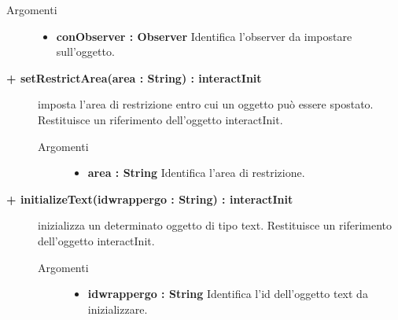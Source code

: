 \begin{description}
\begin{description}
		\begin{description}
			\item[Argomenti] \hfill
				\begin{itemize}
				
					\item \textbf{conObserver : Observer			} \hfill
						Identifica l'observer da impostare sull'oggetto.
					
				\end{itemize}
		\end{description}
	\end{description}			

	\begin{description}
		\item[\textbf{\color{blue}+ setRestrictArea(area : String) : interactInit			}] \hfill
			imposta l'area di restrizione entro cui un oggetto può essere spostato. Restituisce un riferimento dell'oggetto interactInit.
			
		\begin{description}
			\item[Argomenti] \hfill
				\begin{itemize}
				
					\item \textbf{area : String			} \hfill
						Identifica l'area di restrizione.
					
				\end{itemize}
		\end{description}
	\end{description}
	
		\begin{description}
		\item[\textbf{\color{blue}+ initializeText(idwrappergo : String) : interactInit			}] \hfill
			inizializza un determinato oggetto di tipo text. Restituisce un riferimento dell'oggetto interactInit.
			
		\begin{description}
			\item[Argomenti] \hfill
				\begin{itemize}
				
					\item \textbf{idwrappergo : String			} \hfill
						Identifica l'id dell'oggetto text da inizializzare.
					
				\end{itemize}
		\end{description}
	\end{description}	
	

\end{description}
